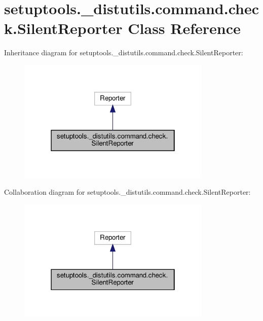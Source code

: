 \hypertarget{classsetuptools_1_1__distutils_1_1command_1_1check_1_1SilentReporter}{}\section{setuptools.\+\_\+distutils.\+command.\+check.\+Silent\+Reporter Class Reference}
\label{classsetuptools_1_1__distutils_1_1command_1_1check_1_1SilentReporter}


Inheritance diagram for setuptools.\+\_\+distutils.\+command.\+check.\+Silent\+Reporter\+:
\nopagebreak
\begin{figure}[H]
\begin{center}
\leavevmode
\includegraphics[width=262pt]{classsetuptools_1_1__distutils_1_1command_1_1check_1_1SilentReporter__inherit__graph}
\end{center}
\end{figure}


Collaboration diagram for setuptools.\+\_\+distutils.\+command.\+check.\+Silent\+Reporter\+:
\nopagebreak
\begin{figure}[H]
\begin{center}
\leavevmode
\includegraphics[width=262pt]{classsetuptools_1_1__distutils_1_1command_1_1check_1_1SilentReporter__coll__graph}
\end{center}
\end{figure}
